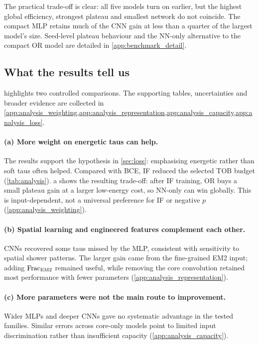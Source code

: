The practical trade-off is clear: all five models turn on earlier, but the highest global efficiency, strongest plateau and smallest network do not coincide. The compact MLP retains much of the CNN gain at less than a quarter of the largest model's size. Seed-level plateau behaviour and the NN-only alternative to the compact OR model are detailed in \cref{app:benchmark_detail}.

\subsection{What the results tell us}
\label{sec:analysis}
 highlights two controlled comparisons. The supporting tables, uncertainties and broader evidence are collected in \cref{app:analysis_weighting,app:analysis_representation,app:analysis_capacity,app:analysis_loss}.



\paragraph{(a) More weight on energetic taus can help.}
The results support the hypothesis in \cref{sec:loss}: emphasising energetic rather than soft taus often helped. Compared with BCE, IF reduced the selected TOB budget (\cref{tab:analysis}). a shows the resulting trade-off: after IF training, OR buys a small plateau gain at a larger low-energy cost, so NN-only can win globally. This is input-dependent, not a universal preference for IF or negative $p$ (\cref{app:analysis_weighting}).

\paragraph{(b) Spatial learning and engineered features complement each other.}
CNNs recovered some taus missed by the MLP, consistent with sensitivity to spatial shower patterns. The larger gain came from the fine-grained EM2 input; adding $\mathrm{Frac}_{\mathrm{EM2}}$ remained useful, while removing the core convolution retained most performance with fewer parameters (\cref{app:analysis_representation}).

\paragraph{(c) More parameters were not the main route to improvement.}
Wider MLPs and deeper CNNs gave no systematic advantage in the tested families. Similar errors across core-only models point to limited input discrimination rather than insufficient capacity (\cref{app:analysis_capacity}).

